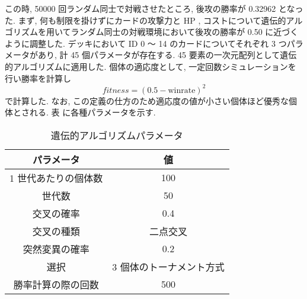 \documentclass{jarticle}     %
\begin{document}
この時, 50000 回ランダム同士で対戦させたところ, 後攻の勝率が 0.32962 となった.
まず, 何も制限を掛けずにカードの攻撃力と HP , コストについて遺伝的アルゴリズムを用いてランダム同士の対戦環境において後攻の勝率が 0.50 に近づくように調整した. 
デッキにおいて ID 0 〜 14 のカードについてそれぞれ 3 つパラメータがあり, 計 45 個パラメータが存在する. 45 要素の一次元配列として遺伝的アルゴリズムに適用した.
個体の適応度として, 一定回数シミュレーションを行い勝率を計算し
\begin{equation}
  fitness = (0.5 - \mathrm{winrate})^2
\end{equation}
で計算した.  なお, この定義の仕方のため適応度の値が小さい個体ほど優秀な個体とされる.
表 に各種パラメータを示す.

\begin{table}[t]
  \centering
  \caption{遺伝的アルゴリズムパラメータ}
  \begin{tabular}{|c|c|}
  \hline
  パラメータ       & 値            \\ \hline \hline
  1 世代あたりの個体数 & 100          \\ \hline
  世代数         & 50           \\ \hline
  交叉の確率       & 0.4          \\ \hline
  交叉の種類       & 二点交叉         \\ \hline
  突然変異の確率     & 0.2          \\ \hline
  選択          & 3 個体のトーナメント方式 \\ \hline
  勝率計算の際の回数 & 500 \\ \hline
  \end{tabular}
  \end{table}
\end{document}
